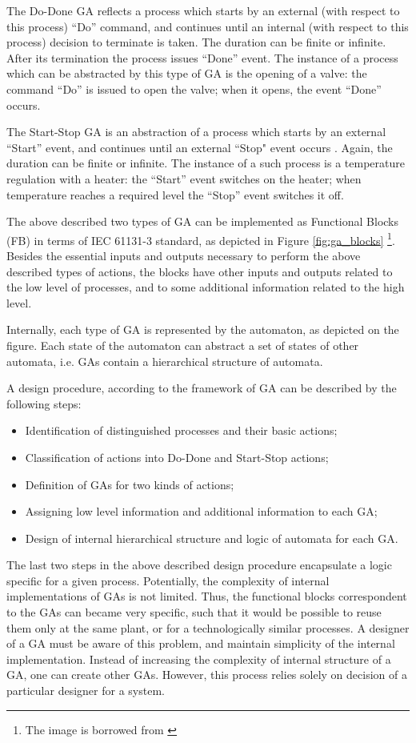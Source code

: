 The Do-Done GA reflects a process which starts by an external (with respect to
this process) ``Do'' command, and continues until an internal (with respect to
this process) decision to terminate is taken. The duration can be finite or
infinite. After its termination the process issues ``Done'' event. The 
instance of a process which can be abstracted by this type of GA is the opening
of a valve: the command ``Do'' is issued to open the valve; when it opens, the
event ``Done'' occurs.

The Start-Stop GA is an abstraction of a process which starts by an external
``Start'' event, and continues until an external ``Stop" event occurs .
Again, the duration can be finite or infinite. The instance of a such process is
a temperature regulation with a heater: the ``Start'' event switches on the
heater; when temperature reaches a required level the ``Stop'' event switches it off.

The above described two types of GA can be implemented as Functional Blocks
(FB) in terms of IEC 61131-3 standard, as depicted in Figure
\ref{fig:ga_blocks}
\footnote{The image is borrowed from \cite{faldella_hierarchical_2008}}. 
Besides the essential inputs and outputs necessary to perform the above described types of actions, the blocks have other inputs and
outputs related to the low level of processes, and to some additional
information related to the high level. 

Internally, each type of GA is represented by the automaton, as depicted on the
figure. Each state of the automaton can abstract a set of states of other
automata, i.e. GAs contain a hierarchical structure of automata.

A design procedure, according to the framework of GA can be described by the
following steps:
\begin{itemize}
  \item Identification of distinguished processes and their basic actions;
  \item Classification of actions into Do-Done and Start-Stop actions;
  \item Definition of GAs for two kinds of actions;
  \item Assigning low level information and additional information to each GA;
  \item Design of internal hierarchical structure and logic of automata for
  each GA.
\end{itemize}

The last two steps in the above described design procedure encapsulate a logic
specific for a given process. Potentially, the complexity of internal
implementations of GAs is not limited. Thus, the functional blocks
correspondent to the GAs can became very specific, such that it would be
possible to reuse them only at the same plant, or for a technologically similar
processes. A designer of a GA must be aware of this problem, and maintain
simplicity of the internal implementation. Instead of increasing the complexity
of internal structure of a GA, one can create other GAs. However, this
process relies solely on decision of a particular designer for a system.

